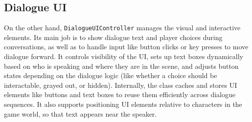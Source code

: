 \subsection{Dialogue UI}
\label{devlog:Dialogue UI}
On the other hand, \verb|DialogueUIController| manages the visual and interactive elements. Its main job is to show dialogue text and player choices during conversations, as well as to handle input like button clicks or key presses to move dialogue forward. It controls visibility of the UI, sets up text boxes dynamically based on who is speaking and where they are in the scene, and adjusts button states depending on the dialogue logic (like whether a choice should be interactable, grayed out, or hidden). Internally, the class caches and stores UI elements like buttons and text boxes to reuse them efficiently across dialogue sequences. It also supports positioning UI elements relative to characters in the game world, so that text appears near the speaker.